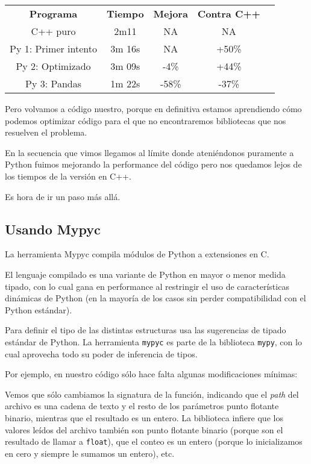 \begin{center}
 \begin{tabular} {ccccc}
 \toprule
  \textbf{Programa} & \textbf{Tiempo} & \textbf{Mejora} & \textbf{Contra C++} \\
  C++ puro & 2m11 & NA & NA \\
  Py 1: Primer intento & 3m 16s & NA & +50\% \\
  Py 2: Optimizado & 3m 09s & -4\% & +44\% \\
  Py 3: Pandas & 1m 22s & -58\% & -37\% \\
  \bottomrule
 \end{tabular}
\end{center}

Pero volvamos a código nuestro, porque en definitiva estamos aprendiendo cómo podemos optimizar código para el que no encontraremos bibliotecas que nos resuelven el problema.

En la secuencia que vimos llegamos al límite donde ateniéndonos puramente a Python fuimos mejorando la performance del código pero nos quedamos lejos de los tiempos de la versión en C++.

Es hora de ir un paso más allá.


\subsection{Usando Mypyc}

La herramienta Mypyc compila módulos de Python a extensiones en C.

El lenguaje compilado es una variante de Python en mayor o menor medida tipado, con lo cual gana en performance al restringir el uso de características dinámicas de Python (en la mayoría de los casos sin perder compatibilidad con el Python estándar).

Para definir el tipo de las distintas estructuras usa las sugerencias de tipado estándar de Python. La herramienta \texttt{mypyc} es parte de la biblioteca \texttt{mypy}, con lo cual aprovecha todo su poder de inferencia de tipos.

Por ejemplo, en nuestro código sólo hace falta algunas modificaciones mínimas:


Vemos que sólo cambiamos la signatura de la función, indicando que el \textit{path} del archivo es una cadena de texto y el resto de los parámetros punto flotante binario, mientras que el resultado es un entero. La biblioteca infiere que los valores leídos del archivo también son punto flotante binario (porque son el resultado de llamar a \texttt{float}), que el conteo es un entero (porque lo inicializamos en cero y siempre le sumamos un entero), etc.

